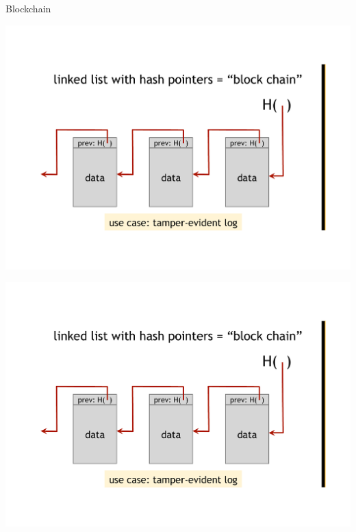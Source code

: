 \begin{frame}{Blockchain}


\begin{overprint}
\begin{center}
\includegraphics[width=\textwidth,page=1]{blockchain}
\end{center}
\begin{center}
\includegraphics[width=\textwidth,page=2]{blockchain}
\end{center}
\begin{center}

\end{center}
\end{overprint}
\end{frame}
